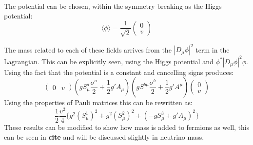 The potential can be chosen, within the symmetry breaking as the Higgs potential:
\begin{equation}
\langle \phi \rangle = \frac{1}{\sqrt{2}}
\begin{pmatrix}
    0\\
    v
\end{pmatrix}
\end{equation}

The mass related to each of these fields arrives from the $|D_\mu \phi |^2$ term in the Lagrangian. This can be explicitly seen, using the Higgs potential and $\phi^* |D_\mu \phi |^2 \phi$. Using the fact that the potential is a constant and cancelling signs produces:
\begin{equation}
\begin{pmatrix}
    0 & v
\end{pmatrix}
(
g S^a_\mu \frac{\sigma^a}{2} + \frac{1}{2}g' A_\mu
)
(
g S^{b\mu} \frac{\sigma^b}{2} + \frac{1}{2}g' A^\mu
)
\begin{pmatrix}
    0\\
    v
\end{pmatrix}
\end{equation}
Using the properties of Pauli matrices this can be rewritten as:
\begin{equation}
\frac{1}{2}\frac{v^2}{4}\lbrace g^2 (S_\mu^1)^2 + g^2 (S_\mu^2)^2 + (-gS^3_\mu+g' A_\mu)^2 \rbrace
\end{equation}
These results can be modified to show how mass is added to fermions as well, this can be seen in \textbf{cite} and will be discussed slightly in neutrino mass.

